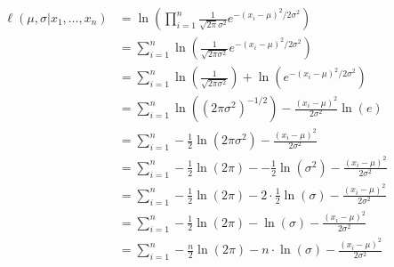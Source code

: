 \begin{align}  
    \ell(\mu,\sigma | x_1, \ldots, x_n) &= \ln(\prod_{i=1}^n \frac{1}{\sqrt{2\pi}\sigma^2} e^{-(x_i-\mu)^2/2\sigma^2}) \\
    &= \sum_{i=1}^n \ln(\frac{1}{\sqrt{2\pi\sigma^2}} e^{-(x_i-\mu)^2/2\sigma^2}) \\
    &= \sum_{i=1}^n \ln(\frac{1}{\sqrt{2\pi\sigma^2}}) + \ln(e^{-(x_i-\mu)^2/2\sigma^2}) \\
    &= \sum_{i=1}^n \ln((2\pi\sigma^2)^{-1/2}) - \frac{(x_i-\mu)^2}{2\sigma^2}\ln(e) \\
    &= \sum_{i=1}^n -\frac{1}{2}\ln(2\pi\sigma^2) - \frac{(x_i-\mu)^2}{2\sigma^2} \\
    &= \sum_{i=1}^n -\frac{1}{2}\ln(2\pi)--\frac{1}{2}\ln(\sigma^2) - \frac{(x_i-\mu)^2}{2\sigma^2} \\
    &= \sum_{i=1}^n -\frac{1}{2}\ln(2\pi)-2\cdot\frac{1}{2}\ln(\sigma) - \frac{(x_i-\mu)^2}{2\sigma^2} \\
    &= \sum_{i=1}^n -\frac{1}{2}\ln(2\pi)-\ln(\sigma) - \frac{(x_i-\mu)^2}{2\sigma^2} \\
    &= \sum_{i=1}^n -\frac{n}{2}\ln(2\pi)- n \cdot \ln(\sigma) - \frac{(x_i-\mu)^2}{2\sigma^2} 
\end{align}
